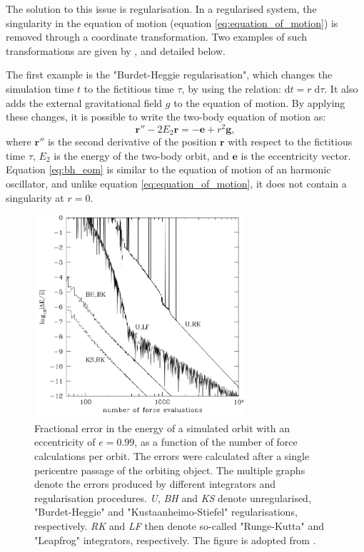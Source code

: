 \documentclass[english, twoside]{HYgradu}
\begin{document}
The solution to this issue is regularisation. In a regularised system, the singularity in the equation of motion (equation \ref{eq:equation_of_motion}) is removed through a coordinate transformation. Two examples of such transformations are given by \cite{BinneyTremaine}, and detailed below.

The first example is the "Burdet-Heggie regularisation", which changes the simulation time $t$ to the fictitious time $\tau$, by using the relation: $\mathrm{d}t = r \; \mathrm{d}\tau$. It also adds the external gravitational field $g$ to the equation of motion. By applying these changes, it is possible to write the two-body equation of motion as:
\begin{equation}
\mathbf{r}'' - 2E_2\mathbf{r} = - \mathbf{e}+r^2\mathbf{g}, \label{eq:bh_eom}
\end{equation}
where $\mathbf{r}''$ is the second derivative of the position $\mathbf{r}$ with respect to the fictitious time $\tau$, $E_2$ is the energy of the two-body orbit, and $\mathbf{e}$ is the eccentricity vector. Equation \ref{eq:bh_eom} is similar to the equation of motion of an harmonic oscillator, and unlike equation \ref{eq:equation_of_motion}, it does not contain a singularity at $r=0$.

\begin{figure}
	\centering
	\includegraphics[width=0.7\textwidth]{binneytremaine_pic.png}
	\caption{Fractional error in the energy of a simulated orbit with an eccentricity of $e=0.99$, as a function of the number of force calculations per orbit. The errors were calculated after a single pericentre passage of the orbiting object. The multiple graphs denote the errors produced by different integrators and regularisation procedures. \textit{U}, \textit{BH} and \textit{KS} denote unregularised, "Burdet-Heggie" and "Kustaanheimo-Stiefel" regularisations, respectively. \textit{RK} and \textit{LF} then denote so-called "Runge-Kutta" and "Leapfrog" integrators, respectively. The figure is adopted from \cite{BinneyTremaine}.}
	\label{figure:regularized}
\end{figure}
\end{document}
